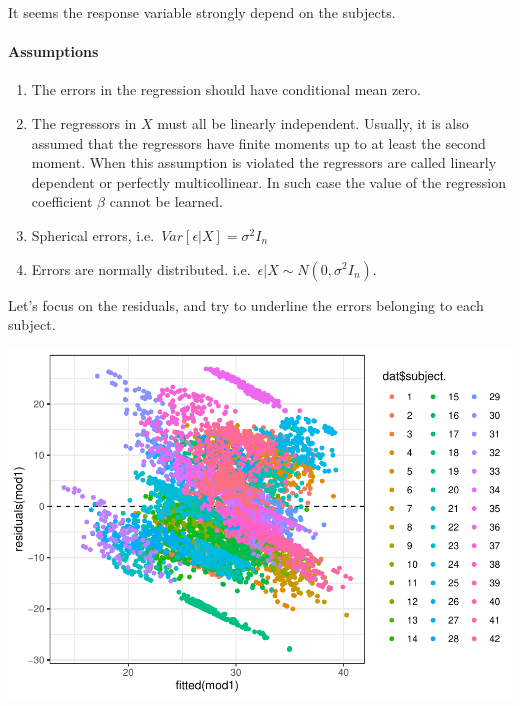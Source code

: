 \documentclass[
]{article}
\newenvironment{Shaded}{\begin{snugshade}}{\end{snugshade}}
\newcommand{\AttributeTok}[1]{\textcolor[rgb]{0.13,0.29,0.53}{#1}}
\newcommand{\DecValTok}[1]{\textcolor[rgb]{0.00,0.00,0.81}{#1}}
\newcommand{\FunctionTok}[1]{\textcolor[rgb]{0.13,0.29,0.53}{\textbf{#1}}}
\newcommand{\NormalTok}[1]{#1}
\newcommand{\SpecialCharTok}[1]{\textcolor[rgb]{0.81,0.36,0.00}{\textbf{#1}}}
\newcommand{\StringTok}[1]{\textcolor[rgb]{0.31,0.60,0.02}{#1}}
\providecommand{\tightlist}{%
  \setlength{\itemsep}{0pt}\setlength{\parskip}{0pt}}
\begin{document}
It seems the response variable strongly depend on the subjects.

\hypertarget{assumptions}{%
\paragraph{Assumptions}\label{assumptions}}

\begin{enumerate}
\def\labelenumi{\arabic{enumi}.}
\tightlist
\item
  The errors in the regression should have conditional mean zero.
\item
  The regressors in \(X\) must all be linearly independent. Usually, it
  is also assumed that the regressors have finite moments up to at least
  the second moment. When this assumption is violated the regressors are
  called linearly dependent or perfectly multicollinear. In such case
  the value of the regression coefficient \(\beta\) cannot be learned.
\item
  Spherical errors, i.e.~\(Var[\epsilon|X] = \sigma^2 I_n\)
\item
  Errors are normally distributed.
  i.e.~\(\epsilon|X \sim N(0, \sigma^2 I_n)\).
\end{enumerate}

Let's focus on the residuals, and try to underline the errors belonging
to each subject.

\begin{Shaded}
\end{Shaded}

\includegraphics{Regression_files/figure-latex/unnamed-chunk-8-1.pdf}
\end{document}
